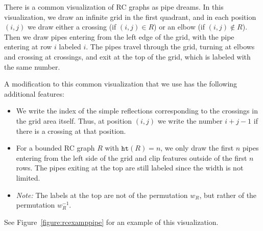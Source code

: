 \documentclass{amsart}
\theoremstyle{definition}
\theoremstyle{remark}
\numberwithin{equation}{subsection}
\newcommand{\wof}[1]{w_{#1}}
\newcommand{\hr}{\mathtt{ht}}
\begin{document}
There is a common visualization of RC graphs as pipe dreams. In this visualization, we draw an infinite grid in the first quadrant, and in each position $(i,j)$ we draw either a crossing (if $(i,j)\in R$) or an elbow (if $(i,j)\notin R$). Then we draw pipes entering from the left edge of the grid, with the pipe entering at row $i$ labeled $i$. The pipes travel through the grid, turning at elbows and crossing at crossings, and exit at the top of the grid, which is labeled with the same number.

A modification to this common visualization that we use has the following additional features:
\begin{itemize}
\item We write the index of the simple reflections corresponding to the crossings in the grid area itself. Thus, at position $(i,j)$ we write the number $i+j-1$ if there is a crossing at that position.
\item For a bounded RC graph $R$ with $\hr(R)=n$, we only draw the first $n$ pipes entering from the left side of the grid and clip features outside of the first $n$ rows. The pipes exiting at the top are still labeled since the width is not limited.
\item \emph{Note:} The labels at the top are not of the permutation $\wof{R}$, but rather of the permutation $\wof{R}^{-1}$.
\end{itemize}

See Figure~\ref{figure:rcexamppipe} for an example of this visualization.	
\end{document}
